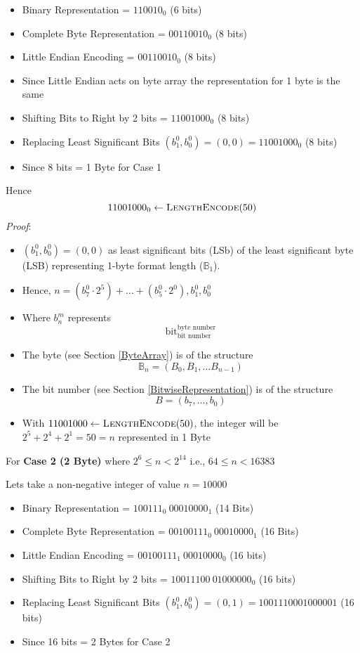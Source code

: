 \documentclass[../alan-handbook.tex]{subfiles}
\begin{document}
\begin{itemize}
    \item Binary Representation = $110010_0$ (6 bits)
    \item Complete Byte Representation = $00110010_0$ (8 bits)
    \item Little Endian Encoding = $00110010_0$ (8 bits)
    \item Since Little Endian acts on byte array the representation for 1 byte is the same
    \item Shifting Bits to Right by 2 bits = $11001000_0$ (8 bits)
    \item Replacing Least Significant Bits $(b_1^0,b_0^0) = (0,0) = 11001000_0$ (8 bits)
    \item Since 8 bits = 1 Byte for Case 1
\end{itemize}

Hence $$11001000_0 \gets \Call{LengthEncode}{50}$$
\textit{Proof}:
\begin{itemize}
    \item $(b_1^0,b_0^0)=(0,0)$ as least significant bits (LSb) of the least significant byte (LSB) representing 1-byte format length ($\mathbb{B}_1$).
    \item Hence, $n=(b_7^0 \cdot 2^5)+ \ldots + (b_5^0 \cdot 2^0),b_1^0,b_0^0$
    \item Where $b_n^m$ represents 
        $$\text{bit}^{\text{byte number}}_{\text{bit number}}$$
    \item The byte (see Section \ref{ByteArray}) is of the structure 
        $$\mathbb{B}_n = (B_0,B_1,\ldots B_{n-1})$$
    \item The bit number (see Section \ref{BitwiseRepresentation}) is of the structure 
        $$B=(b_7,\ldots,b_0)$$
    \item With $11001000 \gets \Call{LengthEncode}{50}$, the integer will be $2^5+2^4+2^1=50=n$ represented in 1 Byte
\end{itemize} 


For \textbf{Case 2 (2 Byte)} where $2^6 \leq n < 2^{14}$ i.e., $64 \leq n < 16383$

Lets take a non-negative integer of value $n=10000$

\begin{itemize}
    \item Binary Representation = $100111_0 \ 00010000_1$ (14 Bits)
    \item Complete Byte Representation = $00100111_0 \ 00010000_1$ (16 Bits)
    \item Little Endian Encoding = $00100111_1 \ 00010000_0$ (16 bits)
    \item Shifting Bits to Right by 2 bits = $10011100 \ 01000000_0$ (16 bits)
    \item Replacing Least Significant Bits $(b_1^0,b_0^0) = (0,1) = 1001110001000001$ (16 bits)
    \item Since 16 bits = 2 Bytes for Case 2
\end{itemize}
\end{document}
